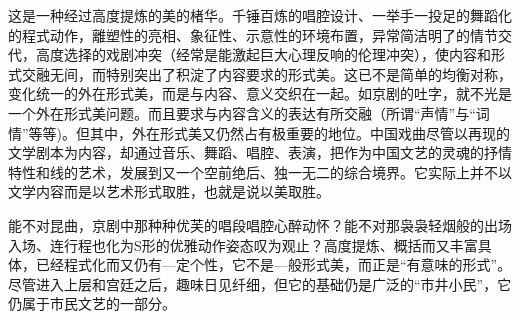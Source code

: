 这是一种经过高度提炼的美的楮华。千锤百炼的唱腔设计、一举手一投足的舞蹈化的程式动作，離塑性的亮相、象征性、示意性的环境布置，异常简洁明了的情节交代，高度选择的戏剧冲突（经常是能激起巨大心理反响的伦理冲突），使内容和形式交融无间，而特别突出了积淀了内容要求的形式美。这已不是简单的均衡对称，变化统一的外在形式美，而是与内容、意义交织在一起。如京剧的吐字，就不光是一个外在形式美问题。而且要求与内容含义的表达有所交融（所谓“声情”与“词情”等等)。但其中，外在形式美又仍然占有极重要的地位。中国戏曲尽管以再现的文学剧本为内容，却通过音乐、舞蹈、唱腔、表演，把作为中国文艺的灵魂的抒情特性和线的艺术，发展到又一个空前绝后、独一无二的综合境界。它实际上并不以文学内容而是以艺术形式取胜，也就是说以美取胜。

能不对昆曲，京剧中那种种优芙的唱段唱腔心醉动怀？能不对那袅袅轻烟般的出场入场、连行程也化为S形的优雅动作姿态叹为观止？高度提炼、概括而又丰富具体，已经程式化而又仍有—定个性，它不是—般形式美，而正是“有意味的形式”。尽管进入上层和宫廷之后，趣味日见纤细，但它的基础仍是广泛的“市井小民”，它仍属于市民文艺的一部分。